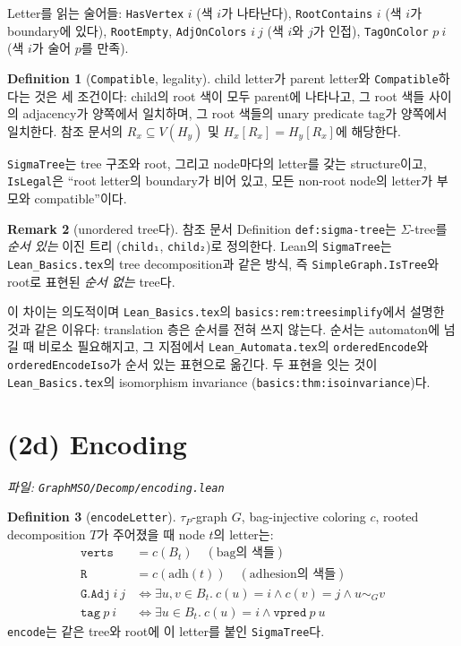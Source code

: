 \documentclass[11pt]{article}
\theoremstyle{definition}
\newtheorem{definition}{Definition}[section]
\newtheorem{remark}[definition]{Remark}
\theoremstyle{plain}
\newcommand{\lean}[1]{\texttt{#1}}
\newcommand{\leanfile}[1]{\texttt{#1}}
\newcommand{\adh}{\mathrm{adh}}
\begin{document}
Letter를 읽는 술어들: \lean{HasVertex} $i$ (색 $i$가 나타난다),
\lean{RootContains} $i$ (색 $i$가 boundary에 있다), \lean{RootEmpty},
\lean{AdjOnColors} $i\ j$ (색 $i$와 $j$가 인접), \lean{TagOnColor} $p\ i$
(색 $i$가 술어 $p$를 만족).

\begin{definition}[\lean{Compatible}, legality]
\label{mso:def:compatible}
child letter가 parent letter와 \lean{Compatible}하다는 것은 세 조건이다:
child의 root 색이 모두 parent에 나타나고, 그 root 색들 사이의 adjacency가
양쪽에서 일치하며, 그 root 색들의 unary predicate tag가 양쪽에서 일치한다.
참조 문서의 $R_x \subseteq V(H_y)$ 및 $H_x[R_x] = H_y[R_x]$에 해당한다.

\lean{SigmaTree}는 tree 구조와 root, 그리고 node마다의 letter를 갖는
structure이고, \lean{IsLegal}은 ``root letter의 boundary가 비어 있고, 모든
non-root node의 letter가 부모와 compatible''이다.
\end{definition}

\begin{remark}[unordered tree다]
\label{mso:rem:unordered}
참조 문서 Definition \lean{def:sigma-tree}는 $\Sigma$-tree를 \emph{순서 있는}
이진 트리 (\lean{child₁}, \lean{child₂})로 정의한다. Lean의 \lean{SigmaTree}는
\leanfile{Lean\_Basics.tex}의 tree decomposition과 같은 방식, 즉
\lean{SimpleGraph.IsTree}와 root로 표현된 \emph{순서 없는} tree다.

이 차이는 의도적이며 \leanfile{Lean\_Basics.tex}의
\lean{basics:rem:treesimplify}에서 설명한 것과 같은 이유다: translation 층은
순서를 전혀 쓰지 않는다. 순서는 automaton에 넘길 때 비로소 필요해지고,
그 지점에서 \leanfile{Lean\_Automata.tex}의 \lean{orderedEncode}와
\lean{orderedEncodeIso}가 순서 있는 표현으로 옮긴다. 두 표현을 잇는 것이
\leanfile{Lean\_Basics.tex}의 isomorphism invariance
(\lean{basics:thm:isoinvariance})다.
\end{remark}

\section{(2d) Encoding}
\label{mso:sec:encoding}

\emph{파일: \leanfile{GraphMSO/Decomp/encoding.lean}}

\begin{definition}[\lean{encodeLetter}]
\label{mso:def:encodeletter}
$\tau_P$-graph $G$, bag-injective coloring $c$, rooted decomposition $T$가
주어졌을 때 node $t$의 letter는:
\[
\begin{array}{ll}
  \lean{verts} &= c(B_t) \quad (\text{bag의 색들}) \\
  \lean{R} &= c(\adh(t)) \quad (\text{adhesion의 색들}) \\
  \lean{G}.\lean{Adj}\ i\ j &\iff \exists u,v \in B_t.\ c(u)=i \land c(v)=j \land u \sim_G v \\
  \lean{tag}\ p\ i &\iff \exists u \in B_t.\ c(u)=i \land \lean{vpred}\ p\ u
\end{array}
\]
\lean{encode}는 같은 tree와 root에 이 letter를 붙인 \lean{SigmaTree}다.
\end{definition}
\end{document}
